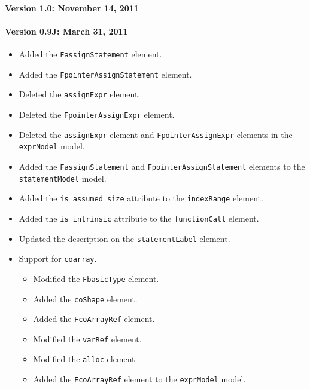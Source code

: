 \paragraph*{Version 1.0: November 14, 2011}

\paragraph*{Version 0.9J: March 31, 2011}

\begin{itemize}
  \item Added the {\tt FassignStatement} element.
  \item Added the {\tt FpointerAssignStatement} element.
  \item Deleted the {\tt assignExpr} element.
  \item Deleted the {\tt FpointerAssignExpr} element.
  \item Deleted the {\tt assignExpr} element and {\tt FpointerAssignExpr} elements in the {\tt exprModel} model.
  \item Added the {\tt FassignStatement} and {\tt FpointerAssignStatement} elements to the {\tt statementModel} model.
  \item Added the {\tt is\_assumed\_size} attribute to the {\tt indexRange} element.
  \item Added the {\tt is\_intrinsic} attribute to the {\tt functionCall} element.
  \item Updated the description on the {\tt statementLabel} element.
  \item Support for {\tt coarray}.
  \begin{itemize}
    \item Modified the {\tt FbasicType} element.
    \item Added the {\tt coShape} element.
    \item Added the {\tt FcoArrayRef} element.
    \item Modified the {\tt varRef} element.
    \item Modified the {\tt alloc} element.
    \item Added the {\tt FcoArrayRef} element to the {\tt exprModel} model.
  \end{itemize}
\end{itemize}

